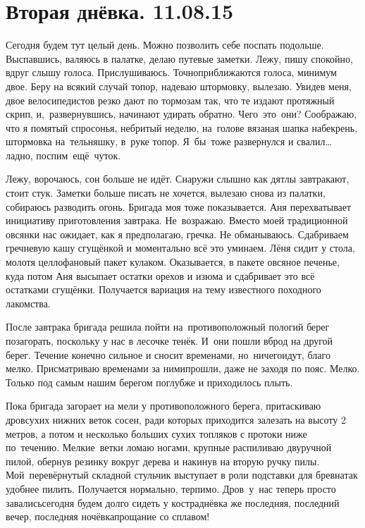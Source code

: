 \chapter{Вторая днёвка. 11.08.15}

Сегодня будем тут целый день. Можно позволить себе поспать подольше. Выспавшись, валяюсь в палатке, делаю путевые заметки. Лежу, пишу спокойно, вдруг слышу голоса. Прислушиваюсь. Точно\mdash приближаются голоса, минимум двое. Беру на всякий случай топор, надеваю штормовку, вылезаю. Увидев меня, двое велосипедистов резко дают по тормозам так, что те издают протяжный скрип, и,~развернувшись, начинают удирать обратно. Чего~это~они? Соображаю, что я помятый спросонья, небритый неделю, на~голове вязаная шапка набекрень, штормовка на~тельняшку, в~руке топор. Я~бы~тоже развернулся и свалил… ладно, поспим~ещё~чуток. 

Лежу, ворочаюсь, сон больше не идёт. Снаружи слышно как дятлы завтракают, стоит стук. Заметки больше писать не хочется, вылезаю снова из палатки, собираюсь разводить огонь. Бригада моя тоже показывается. Аня перехватывает инициативу приготовления завтрака. Не~возражаю. Вместо моей традиционной овсянки нас ожидает, как я предполагаю, гречка. Не обманываюсь. Сдабриваем гречневую кашу сгущёнкой и моментально всё это уминаем. Лёня сидит у стола, молотя целлофановый пакет кулаком. Оказывается, в пакете овсяное печенье, куда потом Аня высыпает остатки орехов и изюма и сдабривает это всё остатками сгущёнки. Получается вариация на тему известного походного лакомства.

После завтрака бригада решила пойти на~противоположный пологий берег позагорать, поскольку у нас в лесочке тенёк. И~они пошли вброд на другой берег. Течение конечно сильное и сносит временами, но~ничего\mdash идут, благо мелко. Присматриваю временами за ними\mdash прошли, даже не заходя по пояс. Мелко. Только под самым нашим берегом поглубже и приходилось плыть. 

Пока бригада загорает на мели у противоположного берега, притаскиваю дров\mdash сухих нижних веток сосен, ради которых приходится залезать на высоту 2 метров, а потом и несколько больших сухих топляков с протоки ниже по~течению. Мелкие~ветки ломаю ногами, крупные распиливаю двуручной пилой, обернув резинку вокруг дерева и накинув на вторую ручку пилы. Мой~перевёрнутый складной стульчик выступает в роли подставки для бревна\mdash так удобнее пилить. Получается нормально, терпимо. Дров~у~нас теперь просто завались\mdash сегодня будем долго сидеть у костра\mdash днёвка же последняя, последний вечер, последняя ночёвка\mdash прощание со сплавом! 

